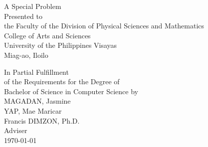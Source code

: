 \begin{titlepage}
\centering


\vspace{1.75cm}
A Special Problem\\
Presented to\\
the Faculty of the Division of Physical Sciences and Mathematics\\
College of Arts and Sciences\\
University of the Philippines Visayas\\
Miag-ao, Iloilo

\vspace{1.75cm}
In Partial Fulfillment\\
of the Requirements for the Degree of\\
Bachelor of Science in Computer Science
\vspace{1.75cm}
by\\

\vspace{1cm}
MAGADAN, Jasmine  \\
YAP, Mae Maricar  \\

\vspace{1.75cm}
Francis DIMZON, Ph.D. \\
Adviser\\

\vspace{1.75cm}
\today
\end{titlepage}
